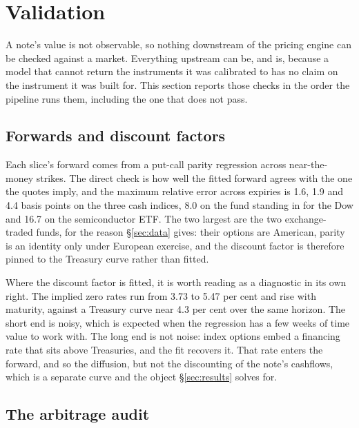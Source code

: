 \section{Validation}\label{sec:validation}

A note's value is not observable, so nothing downstream of the pricing engine
can be checked against a market. Everything upstream can be, and is, because a
model that cannot return the instruments it was calibrated to has no claim on
the instrument it was built for. This section reports those checks in the order
the pipeline runs them, including the one that does not pass.

\subsection{Forwards and discount factors}

Each slice's forward comes from a put-call parity regression across
near-the-money strikes. The direct check is how well the fitted forward agrees
with the one the quotes imply, and the maximum relative error across expiries
is 1.6, 1.9 and 4.4 basis points on the three cash indices, 8.0 on the fund
standing in for the Dow and 16.7 on the semiconductor ETF. The two largest are
the two exchange-traded funds, for the reason \S\ref{sec:data} gives: their
options are American, parity is an identity only under European exercise, and
the discount factor is therefore pinned to the Treasury curve rather than
fitted.

Where the discount factor is fitted, it is worth reading as a diagnostic in its
own right. The implied zero rates run from 3.73 to 5.47 per cent and rise with
maturity, against a Treasury curve near 4.3 per cent over the same horizon. The
short end is noisy, which is expected when the regression has a few weeks of
time value to work with. The long end is not noise: index options embed a
financing rate that sits above Treasuries, and the fit recovers it. That rate
enters the forward, and so the diffusion, but not the discounting of the note's
cashflows, which is a separate curve and the object \S\ref{sec:results} solves
for.

\subsection{The arbitrage audit}

